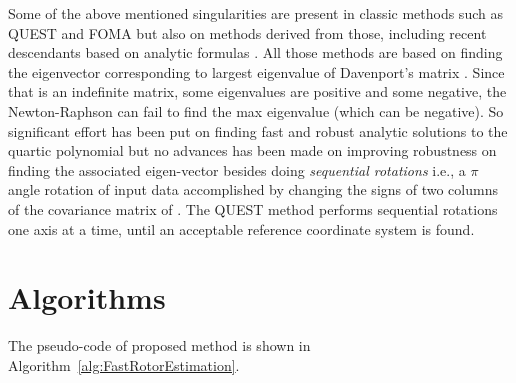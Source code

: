 \documentclass{birkjour}
\numberwithin{equation}{section}
\begin{document}
Some of the above mentioned singularities are present in classic methods such as QUEST \cite{Shuster1981} and FOMA \cite{Markley1993} but also on methods derived from those, including recent descendants based on analytic formulas \cite{Yang2013, Wu2016, Wu2017, Wu2018FA3R, Wu2018FS3R}. All those methods are based on finding the eigenvector corresponding to largest eigenvalue of Davenport's matrix \cite{Davenport1968}. Since that is an indefinite matrix, some eigenvalues are positive and some negative, the Newton-Raphson can fail to find the max eigenvalue (which can be negative). So significant effort has been put on finding fast and robust analytic solutions to the quartic polynomial but no advances has been made on improving robustness on finding the associated eigen-vector besides doing \emph{sequential rotations} i.e., a $\pi$ angle rotation of input data accomplished by changing the signs of two columns of the covariance matrix of \cite{Shuster1981}. The QUEST method performs sequential rotations one axis at a time, until an acceptable reference coordinate system is found.

\section{Algorithms}
\label{section:algoritms}

The pseudo-code of proposed method is shown in Algorithm~\ref{alg:FastRotorEstimation}. 
\end{document}
